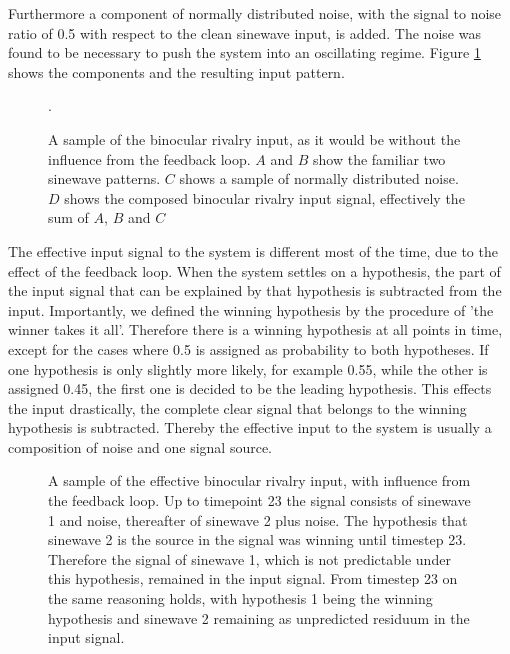 \documentclass{frontiersSCNS} %
\begin{document}
	Furthermore a component of normally distributed noise, with the signal to noise ratio of 0.5 with respect to the clean sinewave input, is added. The noise was found to be necessary to push the system into an oscillating regime.  Figure \ref{input_without_feedback} shows the components and the resulting input pattern.
	
    \begin{figure}
    \centering
    
    \caption[Binocular rivalry input, as it would be without the influence from the feedback loop.]{A sample of the binocular rivalry input, as it would be without the influence from the feedback loop. $A$ and $B$ show the familiar two sinewave patterns. $C$ shows a sample of normally distributed noise. $D$ shows the composed binocular rivalry input signal, effectively the sum of $A$, $B$ and $C$}.
    \label{input_without_feedback}
    \end{figure}	


	The effective input signal to the system is different most of the time, due to the effect of the feedback loop. When the system settles on a hypothesis, the part of the input signal that can be explained by that hypothesis is subtracted from the input. Importantly, we defined the winning hypothesis by the procedure of 'the winner takes it all'. Therefore there is a winning hypothesis at all points in time, except for the cases where 0.5 is assigned as probability to both hypotheses. If one hypothesis is only slightly more likely, for example 0.55, while the other is assigned 0.45, the first one is decided to be the leading hypothesis. This effects the input drastically, the complete clear signal that belongs to the winning hypothesis is subtracted. Thereby the effective input to the system is usually a composition of noise and one signal source. 
	
	 \begin{figure}
	 \centering
	     
	 \caption[Effective binocular rivalry input, with influence from the feedback loop.]{A sample of the effective binocular rivalry input, with influence from the feedback loop. Up to timepoint 23 the signal consists of sinewave 1 and noise, thereafter of sinewave 2 plus noise. The hypothesis that sinewave 2 is the source in the signal was winning until timestep 23. Therefore the signal of sinewave 1, which is not predictable under this hypothesis, remained in the input signal. From timestep 23 on the same reasoning holds, with hypothesis 1 being the winning hypothesis and sinewave 2 remaining as unpredicted residuum in the input signal.}
	 \label{sample_binocular_input}
	 \end{figure}	
	
\end{document}
